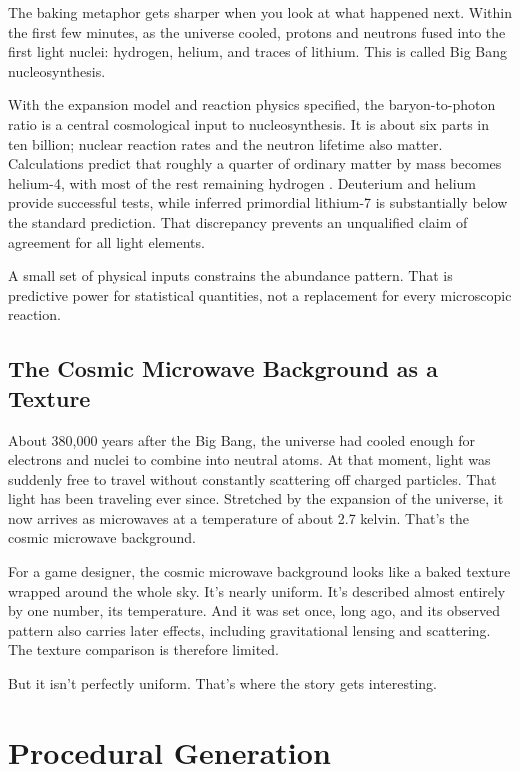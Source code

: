The baking metaphor gets sharper when you look at what happened next. Within the first few minutes, as the universe cooled, protons and neutrons fused into the first light nuclei: hydrogen, helium, and traces of lithium. This is called Big Bang nucleosynthesis.

With the expansion model and reaction physics specified, the baryon-to-photon ratio is a central cosmological input to nucleosynthesis. It is about six parts in ten billion; nuclear reaction rates and the neutron lifetime also matter. Calculations predict that roughly a quarter of ordinary matter by mass becomes helium-4, with most of the rest remaining hydrogen \cite{pitrou2018nucleosynthesis}. Deuterium and helium provide successful tests, while inferred primordial lithium-7 is substantially below the standard prediction. That discrepancy prevents an unqualified claim of agreement for all light elements.

A small set of physical inputs constrains the abundance pattern. That is predictive power for statistical quantities, not a replacement for every microscopic reaction.

\subsection{The Cosmic Microwave Background as a Texture}

About 380,000 years after the Big Bang, the universe had cooled enough for electrons and nuclei to combine into neutral atoms. At that moment, light was suddenly free to travel without constantly scattering off charged particles. That light has been traveling ever since. Stretched by the expansion of the universe, it now arrives as microwaves at a temperature of about 2.7 kelvin. That's the cosmic microwave background.

For a game designer, the cosmic microwave background looks like a baked texture wrapped around the whole sky. It's nearly uniform. It's described almost entirely by one number, its temperature. And it was set once, long ago, and its observed pattern also carries later effects, including gravitational lensing and scattering. The texture comparison is therefore limited.

But it isn't perfectly uniform. That's where the story gets interesting.

\section{Procedural Generation}

